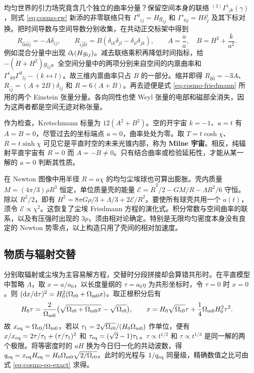 均匀世界的引力场究竟含几个独立的曲率分量？保留空间本身的联络 $ {}^{(3)}\Gamma^i{}_{jk}(\gamma)$，则式 \eqref{eq:cosmo-rw} 新添的非零联络只有 $\Gamma^0{}_{ij}=H g_{ij}$ 和 $\Gamma^i{}_{0j}=H\delta^i_j$ 及其下标对换。把时间导数与空间导数分别收集，在共动正交标架中得到
\begin{equation}\label{eq:cosmo-orth-curv}
 R_{\hat0\hat i\hat0\hat j}=-A\delta_{ij},\qquad
 R_{\hat i\hat j\hat k\hat l}=B(\delta_{ik}\delta_{jl}-\delta_{il}\delta_{jk}),
 \qquad A=\frac{\ddot a}{a},\quad B=H^2+\frac{k}{a^2}.
\end{equation}
例如混合分量中出现 $\partial_t(Hg_{ij})$。减去联络乘积再降低时间指标，给 $-(\dot H+H^2)g_{ij}$。全空间分量中的两项分别来自空间的内禀曲率和 $\Gamma^i{}_{k0}\Gamma^0{}_{lj}-(k\leftrightarrow l)$。故三维内禀曲率只占 $B$ 的一部分。缩并即得 $R_{\hat0\hat0}=-3A$、$R_{\hat i\hat j}=(A+2B)\delta_{ij}$ 和 $R=6(A+B)$。再去迹便是式 \eqref{eq:cosmo-friedmann} 所用的两个 Einstein 张量分量。各向同性也使 Weyl 张量的电部和磁部全消失，因为这两者都是空间无迹对称张量。

作为检查，Kretschmann 标量为 $12(A^2+B^2)$。空的开宇宙 $k=-1$、$a=t$ 有 $A=B=0$，尽管过去的坐标端点 $a=0$，曲率处处为零。取 $T=t\cosh\chi$、$R=t\sinh\chi$ 可见它是平直时空的未来光锥内部，称为 \textbf{Milne 宇宙}。相反，纯辐射平直宇宙有 $R=0$ 而 $A=-B\ne0$。只有结合曲率或检验延拓性，才能从某一解的 $a=0$ 判断其性质。

在 Newton 图像中用半径 $R=a\chi$ 的均匀尘埃球也可算出膨胀。壳内质量 $M=(4\pi/3)\rho R^3$ 恒定，单位质量壳的能量 $\mathcal E=\dot R^2/2-GM/R-\Lambda R^2/6$ 守恒。除以 $R^2/2$，即有 $H^2=8\pi G\rho/3+\Lambda/3+2\mathcal E/R^2$。要使所有球壳共用一个 $a(t)$，须令 $\mathcal E\propto\chi^2$。这恢复了尘埃 Friedmann 方程的演化式。积分常数与空间曲率的联系，以及有压强时出现的 $3p$，须由相对论确定。特别是无限均匀密度本身没有良定的 Newton 势零点，以上构造只用了壳间的相对加速度。

\subsection{物质与辐射交替}

分别取辐射或尘埃为主容易解方程，交替时分段拼接却会算错共形时。在平直模型中暂略 $\Lambda$，取 $x=a/a_0$，以长度量纲的 $\tau=a_0\eta$ 为共形坐标时，令 $\tau=0$ 时 $x=0$。则 $(\dd x/\dd\tau)^2=H_0^2(\Omega_{\rm r0}+\Omega_{\rm m0}x)$。取正根积分后有
\begin{equation}\label{eq:cosmo-eq-exact}
 H_0\tau=\frac{2}{\Omega_{\rm m0}}
      \big(\sqrt{\Omega_{\rm r0}+\Omega_{\rm m0}x}-\sqrt{\Omega_{\rm r0}}\big),
 \qquad
 x=H_0\sqrt{\Omega_{\rm r0}}\tau+\frac14\Omega_{\rm m0}H_0^2\tau^2 .
\end{equation}
故 $x_{\rm eq}=\Omega_{\rm r0}/\Omega_{\rm m0}$，若以 $\tau_1=2\sqrt{\Omega_{\rm r0}}/(H_0\Omega_{\rm m0})$ 作单位，便有 $x/x_{\rm eq}=2\tau/\tau_1+(\tau/\tau_1)^2$ 和 $\tau_{\rm eq}=(\sqrt2-1)\tau_1$。$\tau\propto t^{1/2}$ 和 $\tau\propto t^{1/3}$ 是同一解的两个极限。将等密度时的 $aH$ 换为今日归一化的共动波数，得 $q_{\rm eq}=x_{\rm eq}H_{\rm eq}=H_0\Omega_{\rm m0}\sqrt{2/\Omega_{\rm r0}}$。此时的光程与 $1/q_{\rm eq}$ 同量级，精确数值之比可由式 \eqref{eq:cosmo-eq-exact} 求得。

